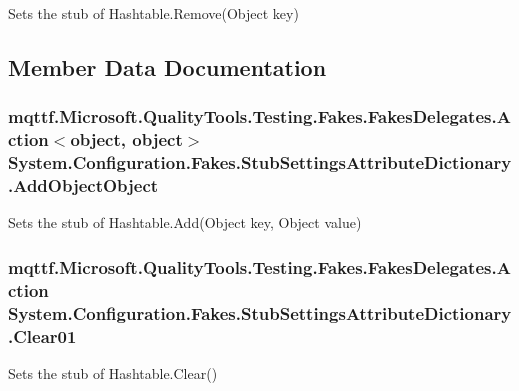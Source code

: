 Sets the stub of Hashtable.\-Remove(\-Object key)



\subsection{Member Data Documentation}
\hypertarget{class_system_1_1_configuration_1_1_fakes_1_1_stub_settings_attribute_dictionary_a347b53278f5527063690461ab85c0df2}{
\subsubsection[{Add\-Object\-Object}]{\setlength{\rightskip}{0pt plus 5cm}mqttf.\-Microsoft.\-Quality\-Tools.\-Testing.\-Fakes.\-Fakes\-Delegates.\-Action$<$object, object$>$ System.\-Configuration.\-Fakes.\-Stub\-Settings\-Attribute\-Dictionary.\-Add\-Object\-Object}}\label{class_system_1_1_configuration_1_1_fakes_1_1_stub_settings_attribute_dictionary_a347b53278f5527063690461ab85c0df2}


Sets the stub of Hashtable.\-Add(\-Object key, Object value)

\hypertarget{class_system_1_1_configuration_1_1_fakes_1_1_stub_settings_attribute_dictionary_a3c518479b464cc42841ed0778a25d6f1}{
\subsubsection[{Clear01}]{\setlength{\rightskip}{0pt plus 5cm}mqttf.\-Microsoft.\-Quality\-Tools.\-Testing.\-Fakes.\-Fakes\-Delegates.\-Action System.\-Configuration.\-Fakes.\-Stub\-Settings\-Attribute\-Dictionary.\-Clear01}}\label{class_system_1_1_configuration_1_1_fakes_1_1_stub_settings_attribute_dictionary_a3c518479b464cc42841ed0778a25d6f1}


Sets the stub of Hashtable.\-Clear()

